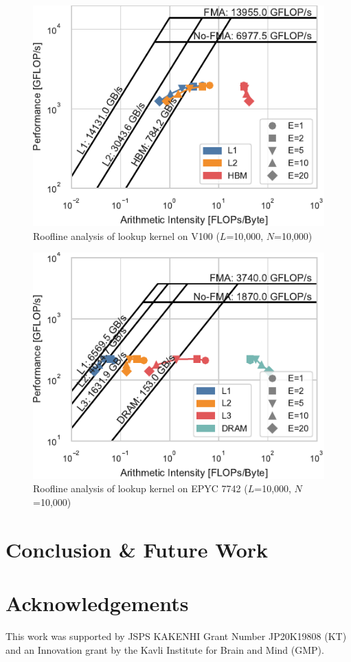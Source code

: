 \documentclass[conference]{IEEEtran}
\begin{document}
\begin{figure}
    \centering
    \includegraphics{figs/roofline_lookup_v100}
    \caption{Roofline analysis of lookup kernel on V100 ($L$=10,000, $N$=10,000)}%
    \label{fig:roofline-lookup-v100}
\end{figure}

\begin{figure}
    \centering
    \includegraphics{figs/roofline_lookup_epyc}
    \caption{Roofline analysis of lookup kernel on EPYC 7742 ($L$=10,000, $N$=10,000)}%
    \label{fig:roofline-lookup-eypc}
\end{figure}

\section{Conclusion \& Future Work}

\section*{Acknowledgements}
This work was supported by JSPS KAKENHI Grant Number JP20K19808 (KT) and an
Innovation grant by the Kavli Institute for Brain and Mind (GMP).



\end{document}
